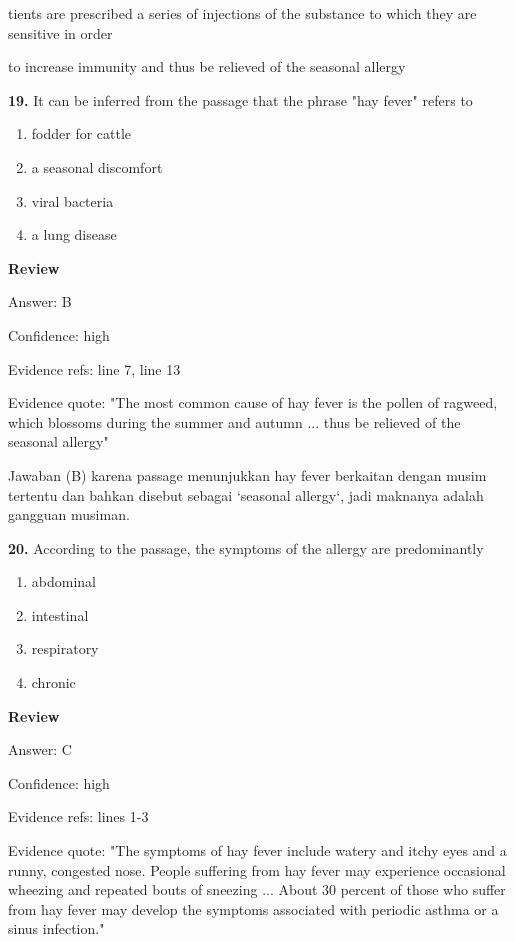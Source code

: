 \documentclass[12pt]{article}
\begin{document}
tients are prescribed a series of injections of the substance to which they are sensitive in order\par
to increase immunity and thus be relieved of the seasonal allergy\par
\endgroup
\medskip
\noindent\textbf{19.} It can be inferred from the passage that the phrase "hay fever" refers to
\begin{enumerate}[label=(\Alph*),leftmargin=*,itemsep=0.2em]
\item fodder for cattle
\item a seasonal discomfort
\item viral bacteria
\item a lung disease
\end{enumerate}
\par
\begingroup
\setlength{\parskip}{0pt}
\setlength{\parindent}{0pt}
\textbf{Review}\par
Answer: B\par
Confidence: high\par
Evidence refs: line 7, line 13\par
Evidence quote: "The most common cause of hay fever is the pollen of ragweed, which blossoms during the summer and autumn ... thus be relieved of the seasonal allergy"\par
Jawaban (B) karena passage menunjukkan hay fever berkaitan dengan musim tertentu dan bahkan disebut sebagai `seasonal allergy`, jadi maknanya adalah gangguan musiman.\par
\endgroup
\par
\vspace{0.25\baselineskip}
\noindent\textbf{20.} According to the passage, the symptoms of the allergy are predominantly
\begin{enumerate}[label=(\Alph*),leftmargin=*,itemsep=0.2em]
\item abdominal
\item intestinal
\item respiratory
\item chronic
\end{enumerate}
\par
\begingroup
\setlength{\parskip}{0pt}
\setlength{\parindent}{0pt}
\textbf{Review}\par
Answer: C\par
Confidence: high\par
Evidence refs: lines 1-3\par
Evidence quote: "The symptoms of hay fever include watery and itchy eyes and a runny, congested nose. People suffering from hay fever may experience occasional wheezing and repeated bouts of sneezing ... About 30 percent of those who suffer from hay fever may develop the symptoms associated with periodic asthma or a sinus infection."\par
\end{document}
